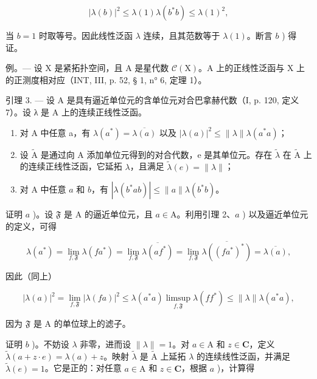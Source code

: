 \[
| \lambda (b) | ^ {2} \leqslant \lambda (1) \lambda (b ^ {*} b) \leqslant \lambda (1) ^ {2},
\]

当 \(b = 1\) 时取等号。因此线性泛函 \(\lambda\) 连续，且其范数等于 \(\lambda(1)\)。断言 \(b\) ) 得证。

例。--- 设 X 是紧拓扑空间，且 A 是星代数 \(\mathcal{C}(\mathrm{X})\)。A 上的正线性泛函与 X 上的正测度相对应（INT, III, p. 52, § 1, n° 6, 定理 1）。

引理 3. --- 设 A 是具有逼近单位元的含单位元对合巴拿赫代数（I, p. 120, 定义 7）。设 λ 是 A 上的连续正线性泛函。

\begin{enumerate}
\def\labelenumi{\alph{enumi})}
\item
  对 A 中任意 a，有 \(\lambda(a^{*})=\overline{\lambda(a)}\) 以及 \(|\lambda(a)|^{2}\leqslant\|\lambda\|\lambda(a^{*}a)\)；
\item
  设 \(\widetilde{\mathrm{A}}\) 是通过向 A 添加单位元得到的对合代数，e 是其单位元。存在 \(\widetilde{\lambda}\) 在 \(\widetilde{\mathrm{A}}\) 上的连续正线性泛函，它延拓 \(\lambda\)，且满足 \(\widetilde{\lambda}(e) = \|\lambda\|\)；
\item
  对 A 中任意 \(a\) 和 \(b\)，有 \(|\lambda(b^{*}ab)|\leqslant\|a\|\lambda(b^{*}b)\)。
\end{enumerate}

证明 \(a\) )。设 \(\mathfrak{F}\) 是 A 的逼近单位元，且 \(a \in \mathrm{A}\)。利用引理 2、\(a\) ) 以及逼近单位元的定义，可得

\[
\lambda (a ^ {*}) = \lim _ {f, \mathfrak {F}} \lambda (f a ^ {*}) = \lim _ {f, \mathfrak {F}} \overline {{\lambda (a f ^ {*})}} = \lim _ {f, \mathfrak {F}} \overline {{\lambda ((f a ^ {*}) ^ {*})}} = \overline {{\lambda (a)}},
\]

因此（同上）

\[
| \lambda (a) | ^ {2} = \lim _ {f, \mathfrak {F}} | \lambda (f a) | ^ {2} \leqslant \lambda (a ^ {*} a) \operatorname * {limsup} _ {f, \mathfrak {F}} \lambda (f f ^ {*}) \leqslant \| \lambda \| \lambda (a ^ {*} a),
\]

因为 \(\mathfrak{F}\) 是 A 的单位球上的滤子。

证明 \(b\) )。不妨设 \(\lambda\) 非零，进而设 \(\| \lambda \| = 1\)。对 \(a \in \mathrm{A}\) 和 \(z \in \mathbf{C}\)，定义 \(\widetilde{\lambda}(a + z \cdot e) = \lambda(a) + z\)。映射 \(\widetilde{\lambda}\) 是 \(\widetilde{\mathrm{A}}\) 上延拓 \(\lambda\) 的连续线性泛函，并满足 \(\widetilde{\lambda}(e) = 1\)。它是正的：对任意 \(a \in \mathrm{A}\) 和 \(z \in \mathbf{C}\)，根据 \(a\) )，计算得

